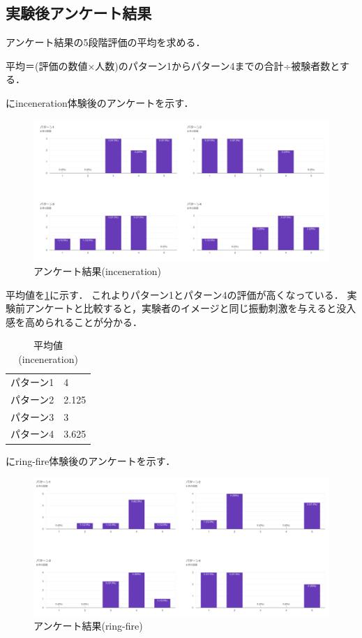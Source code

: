 \newpage

\subsection{実験後アンケート結果}
アンケート結果の5段階評価の平均を求める．

平均＝(評価の数値×人数)のパターン1からパターン4までの合計÷被験者数とする．

にinceneration体験後のアンケートを示す．

\begin{figure}[h]
  \centering
  \includegraphics[clip,width=14cm]{./fig/incenerationAnk.png}
  \caption{アンケート結果(inceneration)}\label{inceAnk}
  \end{figure}
  


平均値を\ref{tab;inceAvera}に示す．
これよりパターン1とパターン4の評価が高くなっている．
実験前アンケートと比較すると，実験者のイメージと同じ振動刺激を与えると没入感を高められることが分かる．
\begin{table}[h]
    \caption{平均値(inceneration)}
    \centering
    \begin{tabular}{l|l}
    \hline
    \hline
    パターン1 & 4\\
    パターン2 & 2.125\\
    パターン3 & 3\\
    パターン4 & 3.625\\
    \hline
    \end{tabular}
    \label{tab;inceAvera}
\end{table}

にring-fire体験後のアンケートを示す．

\begin{figure}[h]
  \centering
  \includegraphics[clip,width=14cm]{fig/ringfireAnk.png}
  \caption{アンケート結果(ring-fire)}\label{ringAnk}
  \end{figure}


